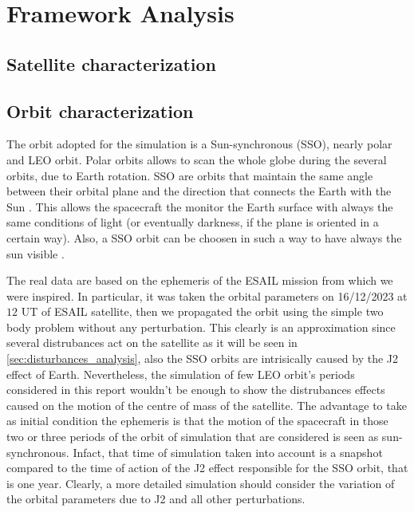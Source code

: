 \section{Framework Analysis}
\label{sec:framework}

\subsection{Satellite characterization }
\label{subsec:sat_characterization}



\subsection{Orbit characterization}
\label{subsec:orbit_characterization}

The orbit adopted for the simulation is a Sun-synchronous (SSO), nearly polar and LEO orbit. Polar orbits allows to scan the whole globe during
the several orbits, due to Earth rotation. SSO are orbits that maintain the same angle between their orbital plane and the direction that connects
the Earth with the Sun \cite{curtis_book}. This allows the spacecraft the monitor the Earth surface with always the same conditions of light 
(or eventually darkness, if the plane is oriented in a certain way). Also, a SSO orbit can be choosen in such a way to have always the sun visible \cite{esa_sso_site}.

The real data are based on the ephemeris of the ESAIL mission from which we were inspired. In particular, it was taken the orbital parameters on 16/12/2023 at $12$ UT of ESAIL satellite, then we 
propagated the orbit using the simple two body problem  without any perturbation. This clearly is an approximation since several distrubances act 
on the satellite as it will be seen in \autoref{sec:disturbances_analysis}, also the SSO orbits are intrisically caused by the J2 effect of Earth.
Nevertheless, the simulation of few LEO orbit's periods considered in this report wouldn't be enough to show the distrubances effects caused on 
the motion of the centre of mass of the satellite. The advantage to take as initial condition the ephemeris is that the motion of the spacecraft in 
those two or three periods of the orbit of simulation that are considered is seen as sun-synchronous. Infact, that time of simulation taken into account
is a snapshot compared to the time of action of the J2 effect responsible for the SSO orbit, that is one year. Clearly, a more detailed simulation should
consider the variation of the orbital parameters due to J2 and all other perturbations.

